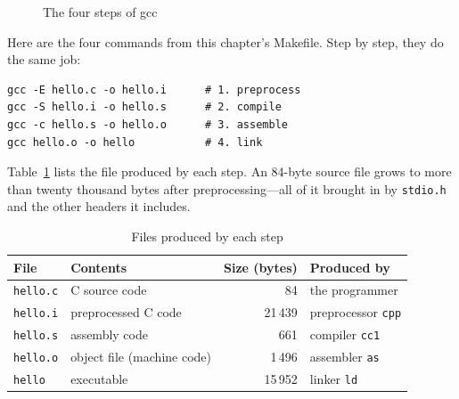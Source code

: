 \begin{figure}[htbp]
  \centering
  \caption{The four steps of gcc}
  \label{fig:toolchain}
\end{figure}

Here are the four commands from this chapter's Makefile. Step by step, they do the same job:
\begin{verbatim}
gcc -E hello.c -o hello.i      # 1. preprocess
gcc -S hello.i -o hello.s      # 2. compile
gcc -c hello.s -o hello.o      # 3. assemble
gcc hello.o -o hello           # 4. link
\end{verbatim}

Table~\ref{tab:hello-files} lists the file produced by each step. An 84-byte source file grows to more than twenty thousand bytes after preprocessing---all of it brought in by \texttt{stdio.h} and the other headers it includes.

\begin{table}[htbp]
  \centering
  \caption{Files produced by each step}
  \label{tab:hello-files}
  \small
  \begin{tabular}{llrl}
    \toprule
    File & Contents & Size (bytes) & Produced by \\
    \midrule
    \texttt{hello.c} & C source code            & 84      & the programmer \\
    \texttt{hello.i} & preprocessed C code      & 21\,439 & preprocessor \texttt{cpp} \\
    \texttt{hello.s} & assembly code            & 661     & compiler \texttt{cc1} \\
    \texttt{hello.o} & object file (machine code) & 1\,496 & assembler \texttt{as} \\
    \texttt{hello}   & executable               & 15\,952 & linker \texttt{ld} \\
    \bottomrule
  \end{tabular}
\end{table}

